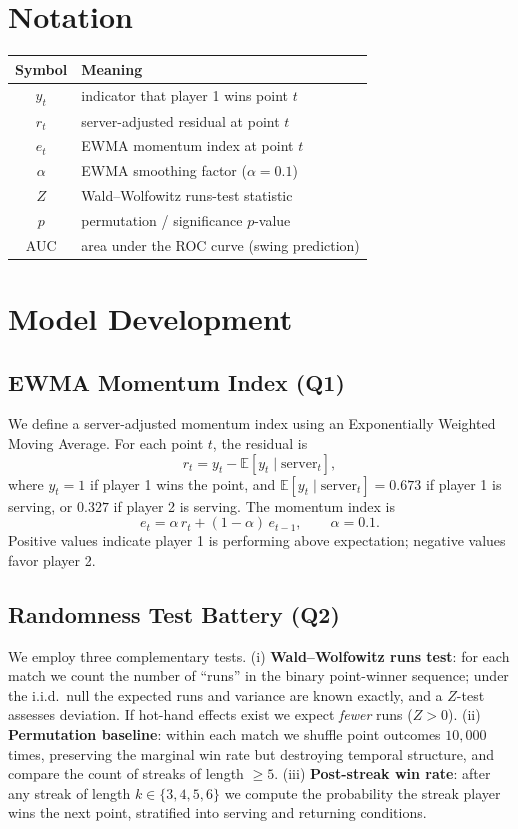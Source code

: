 \documentclass[11pt,a4paper]{article}
\begin{document}
\section{Notation}
\begin{center}
\begin{tabular}{cl}
\toprule
Symbol & Meaning \\
\midrule
$y_t$ & indicator that player 1 wins point $t$ \\
$r_t$ & server-adjusted residual at point $t$ \\
$e_t$ & EWMA momentum index at point $t$ \\
$\alpha$ & EWMA smoothing factor ($\alpha = 0.1$) \\
$Z$ & Wald--Wolfowitz runs-test statistic \\
$p$ & permutation / significance $p$-value \\
AUC & area under the ROC curve (swing prediction) \\
\bottomrule
\end{tabular}
\end{center}

\section{Model Development}
\subsection{EWMA Momentum Index (Q1)}
We define a server-adjusted momentum index using an Exponentially Weighted Moving Average. For each point $t$, the residual is
\[
  r_t = y_t - \mathbb{E}[y_t \mid \text{server}_t],
\]
where $y_t = 1$ if player 1 wins the point, and $\mathbb{E}[y_t \mid \text{server}_t] = 0.673$ if player 1 is serving, or $0.327$ if player 2 is serving. The momentum index is
\[
  e_t = \alpha\, r_t + (1-\alpha)\, e_{t-1}, \qquad \alpha = 0.1 .
\]
Positive values indicate player 1 is performing above expectation; negative values favor player 2.

\subsection{Randomness Test Battery (Q2)}
We employ three complementary tests. (i) \textbf{Wald--Wolfowitz runs test}: for each match we count the number of ``runs'' in the binary point-winner sequence; under the i.i.d.\ null the expected runs and variance are known exactly, and a $Z$-test assesses deviation. If hot-hand effects exist we expect \emph{fewer} runs ($Z > 0$). (ii) \textbf{Permutation baseline}: within each match we shuffle point outcomes $10{,}000$ times, preserving the marginal win rate but destroying temporal structure, and compare the count of streaks of length $\geq 5$. (iii) \textbf{Post-streak win rate}: after any streak of length $k\in\{3,4,5,6\}$ we compute the probability the streak player wins the next point, stratified into serving and returning conditions.
\end{document}
